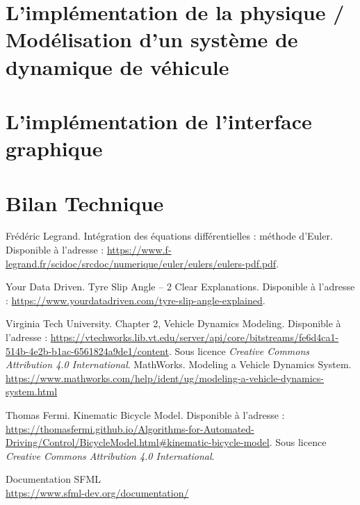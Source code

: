 \documentclass[a4paper,12pt]{report}
\begin{document}
    \section{L'implémentation de la physique / Modélisation d'un système de dynamique de véhicule}\label{sec:l'implementation-de-la-physique-/-modelisation-d'un-systeme-de-dynamique-de-vehicule}
    
    \newpage

    \section{L'implémentation de l'interface graphique}\label{sec:l'implementation-de-l-interface-graphique}
    
    \newpage

    \section{Bilan Technique}\label{sec:bilan-technique}
    
    \newpage


    \begin{thebibliography}{9}
        Frédéric Legrand.
        Intégration des équations différentielles : méthode d'Euler.
        Disponible à l'adresse : \url{https://www.f-legrand.fr/scidoc/srcdoc/numerique/euler/eulers/eulers-pdf.pdf}.

        Your Data Driven.
        Tyre Slip Angle – 2 Clear Explanations.
        Disponible à l'adresse : \url{https://www.yourdatadriven.com/tyre-slip-angle-explained}.


        Virginia Tech University.
        Chapter 2, Vehicle Dynamics Modeling.
        Disponible à l'adresse : \url{https://vtechworks.lib.vt.edu/server/api/core/bitstreams/fe6d4ca1-514b-4e2b-b1ac-6561824a9de1/content}.
        Sous licence \textit{Creative Commons Attribution 4.0 International}.
        MathWorks.
        Modeling a Vehicle Dynamics System.
        \url{https://www.mathworks.com/help/ident/ug/modeling-a-vehicle-dynamics-system.html}

        Thomas Fermi.
        Kinematic Bicycle Model.
        Disponible à l'adresse : \url{https://thomasfermi.github.io/Algorithms-for-Automated-Driving/Control/BicycleModel.html#kinematic-bicycle-model}.
        Sous licence \textit{Creative Commons Attribution 4.0 International}.

        Documentation SFML \\ \url{https://www.sfml-dev.org/documentation/}

    \end{thebibliography}
\end{document}
